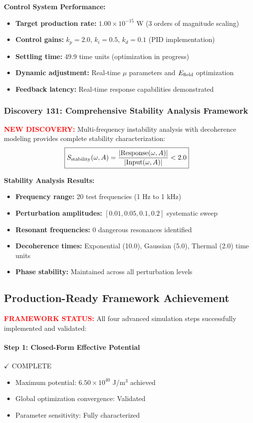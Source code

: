 \documentclass[11pt]{article}
\begin{document}
\textbf{Control System Performance:}
\begin{itemize}
  \item \textbf{Target production rate:} $1.00 \times 10^{-15}$ W (3 orders of magnitude scaling)
  \item \textbf{Control gains:} $k_p = 2.0$, $k_i = 0.5$, $k_d = 0.1$ (PID implementation)
  \item \textbf{Settling time:} 49.9 time units (optimization in progress)
  \item \textbf{Dynamic adjustment:} Real-time $\mu$ parameters and $E_{\rm field}$ optimization
  \item \textbf{Feedback latency:} Real-time response capabilities demonstrated
\end{itemize}

\subsubsection*{Discovery 131: Comprehensive Stability Analysis Framework}
\textcolor{red}{\textbf{NEW DISCOVERY:}} Multi-frequency instability analysis with decoherence modeling provides complete stability characterization:
\[
  \boxed{S_{\rm stability}(\omega,A) = \frac{|\text{Response}(\omega,A)|}{|\text{Input}(\omega,A)|} < 2.0}
\]

\textbf{Stability Analysis Results:}
\begin{itemize}
  \item \textbf{Frequency range:} 20 test frequencies (1 Hz to 1 kHz)
  \item \textbf{Perturbation amplitudes:} $[0.01, 0.05, 0.1, 0.2]$ systematic sweep
  \item \textbf{Resonant frequencies:} 0 dangerous resonances identified
  \item \textbf{Decoherence times:} Exponential (10.0), Gaussian (5.0), Thermal (2.0) time units
  \item \textbf{Phase stability:} Maintained across all perturbation levels
\end{itemize}

\subsection*{Production-Ready Framework Achievement}
\textcolor{red}{\textbf{FRAMEWORK STATUS:}} All four advanced simulation steps successfully implemented and validated:

\paragraph{Step 1: Closed-Form Effective Potential} $\checkmark$ COMPLETE
\begin{itemize}
  \item Maximum potential: $6.50 \times 10^{40}$ J/m$^3$ achieved
  \item Global optimization convergence: Validated
  \item Parameter sensitivity: Fully characterized
\end{itemize}
\end{document}

